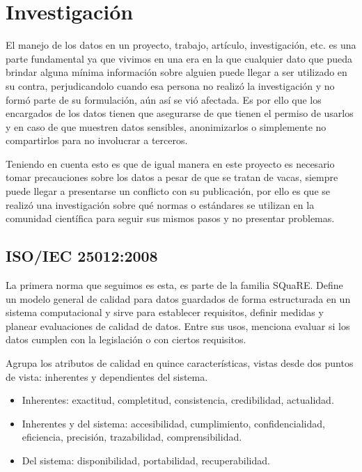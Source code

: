 \section{Investigación}

El manejo de los datos en un proyecto, trabajo, artículo, investigación, etc. es una parte fundamental ya que vivimos en una era en la que cualquier dato que pueda brindar alguna mínima información sobre alguien puede llegar a ser utilizado en su contra, perjudicandolo cuando esa persona no realizó la investigación y no formó parte de su formulación, aún así se vió afectada. Es por ello que los encargados de los datos tienen que asegurarse de que tienen el permiso de usarlos y en caso de que muestren datos sensibles, anonimizarlos o simplemente no compartirlos para no involucrar a terceros.

Teniendo en cuenta esto es que de igual manera en este proyecto es necesario tomar precauciones sobre los datos a pesar de que se tratan de vacas, siempre puede llegar a presentarse un conflicto con su publicación, por ello es que se realizó una investigación sobre qué normas o estándares se utilizan en la comunidad científica para seguir sus mismos pasos y no presentar problemas.

\subsection{ISO/IEC 25012:2008}

La primera norma que seguimos es esta, es parte de la familia SQuaRE. Define un modelo general de calidad para datos guardados de forma estructurada en un sistema computacional y sirve para establecer requisitos, definir medidas y planear evaluaciones de calidad de datos. Entre sus usos, menciona evaluar si los datos cumplen con la legislación o con ciertos requisitos.

Agrupa los atributos de calidad en quince características, vistas desde dos puntos de vista: inherentes y dependientes del sistema.

\begin{itemize}
  \item Inherentes: exactitud, completitud, consistencia, credibilidad, actualidad.
  \item Inherentes y del sistema: accesibilidad, cumplimiento, confidencialidad, eficiencia, precisión, trazabilidad, comprensibilidad.
  \item Del sistema: disponibilidad, portabilidad, recuperabilidad.
\end{itemize}

